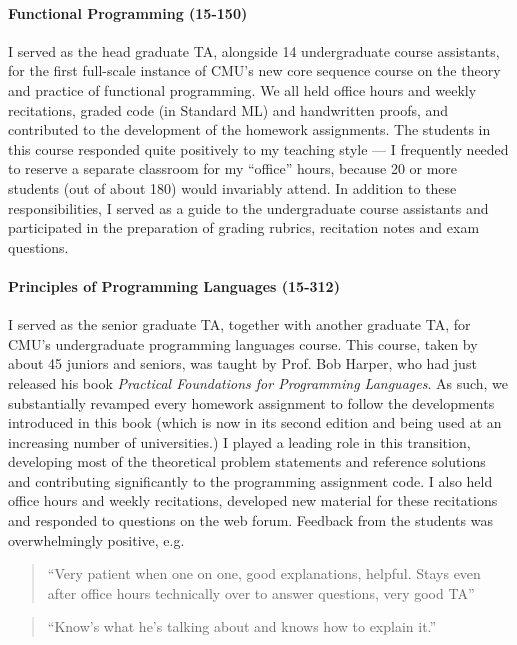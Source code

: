 \documentclass[9pt]{extarticle}
\begin{document}
\paragraph{Functional Programming (15-150)} I served as the head graduate TA, alongside 14 undergraduate course assistants, for the first full-scale instance of CMU's new core sequence course on the theory and practice of functional programming. We all held office hours and weekly recitations, graded code (in Standard ML) and handwritten proofs, and contributed to the development of the homework assignments. The students in this course responded quite positively to my teaching style --- I frequently needed to reserve a separate classroom for my ``office'' hours, because 20 or more students (out of about 180) would invariably attend. In addition to these responsibilities, I served as a guide to the undergraduate course assistants and participated in the preparation of grading rubrics, recitation notes and exam questions.  

\paragraph{Principles of Programming Languages (15-312)} I served as the senior graduate TA, together with another graduate TA, for CMU's undergraduate programming languages course. This course, taken by about 45 juniors and seniors, was taught by Prof. Bob Harper, who had just released his book \emph{Practical Foundations for Programming Languages}. As such, we substantially revamped every homework assignment to follow the developments introduced in this book (which is now in its second edition and being used at an increasing number of universities.) I played a leading role in this transition, developing most of the theoretical problem statements and reference solutions and contributing significantly to the programming assignment code. I also held office hours and weekly recitations, developed new material for these recitations and responded to questions on the web forum. Feedback from the students was overwhelmingly positive, e.g.

\begin{quote}
``Very patient when one on one, good explanations, helpful. Stays even after office hours technically over to answer questions, very good TA''
\end{quote}
\begin{quote}
``Know's what he's talking about and knows how to explain it.''
\end{quote}
\end{document}
